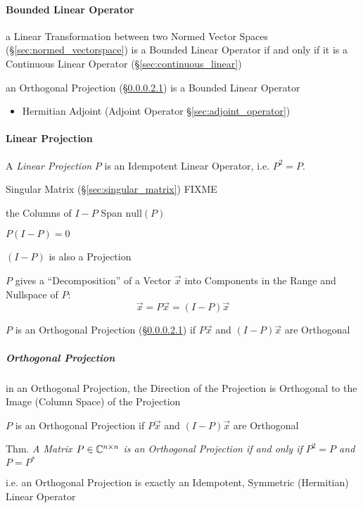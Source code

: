\paragraph{Bounded Linear Operator}\label{sec:bounded_linear_operator}

a Linear Transformation between two Normed Vector Spaces
(\S\ref{sec:normed_vectorspace}) is a Bounded Linear Operator if and
only if it is a Continuous Linear Operator
(\S\ref{sec:continuous_linear})

an Orthogonal Projection (\S\ref{sec:orthogonal_projection}) is a Bounded
Linear Operator

\begin{itemize}
  \item Hermitian Adjoint (Adjoint Operator \S\ref{sec:adjoint_operator})
\end{itemize}



\paragraph{Linear Projection}\label{sec:projection}\hfill

A \emph{Linear Projection} $P$ is an Idempotent Linear Operator, i.e. $P^2 = P$.

Singular Matrix (\S\ref{sec:singular_matrix}) FIXME

the Columns of $I - P$ Span $\mathrm{null}(P)$

$P(I - P) = 0$

$(I - P)$ is also a Projection

$P$ gives a ``Decomposition'' of a Vector $\vec{x}$ into Components in the
Range and Nullspace of $P$:
\[
  \vec{x} = P\vec{x} = (I - P)\vec{x}
\]

$P$ is an Orthogonal Projection (\S\ref{sec:orthogonal_projection}) if
$P\vec{x}$ and $(I-P)\vec{x}$ are Orthogonal



\subparagraph{Orthogonal Projection}\label{sec:orthogonal_projection}\hfill

in an Orthogonal Projection, the Direction of the Projection is Orthogonal to
the Image (Column Space) of the Projection

$P$ is an Orthogonal Projection if $P\vec{x}$ and $(I-P)\vec{x}$ are Orthogonal

Thm. \emph{A Matrix $P \in \mathbb{C}^{n \times n}$ is an Orthogonal Projection if
  and only if $P^2 = P$ and $P = P^*$}

i.e. an Orthogonal Projection is exactly an Idempotent, Symmetric (Hermitian)
Linear Operator

